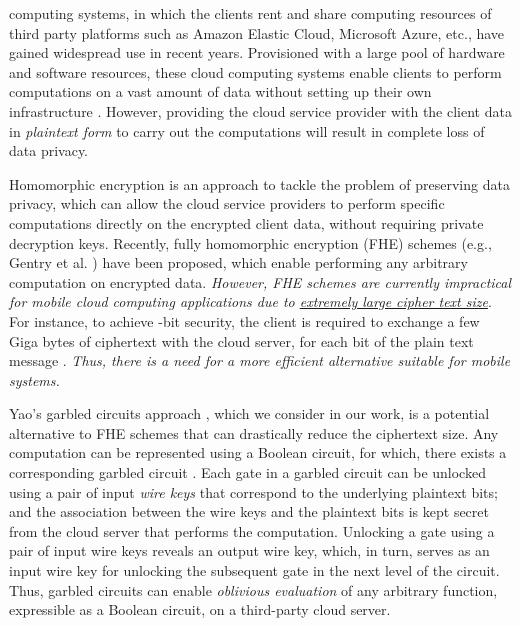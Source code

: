 \documentclass[10pt,journal,cspaper,compsoc]{IEEEtran}
\begin{document}
 computing systems, in which the clients rent and share computing resources of third party platforms such as Amazon Elastic Cloud, Microsoft Azure, etc., have gained widespread use in recent years. Provisioned with a large pool of hardware and software resources, these cloud computing systems enable clients to perform computations on a vast amount of data without setting up their own infrastructure \cite{armbrust10}. However, providing the cloud service provider with the client data in {\em plaintext form} to carry out the computations will result in complete loss of data privacy.


Homomorphic encryption \cite{rivest78} is an approach to tackle the problem of preserving data privacy, which can allow the cloud service providers to perform specific computations directly on the encrypted client data, without requiring private decryption keys. Recently, fully homomorphic encryption (FHE) schemes (e.g., Gentry et al. \cite{gentry10}) have been proposed, which enable performing any arbitrary computation on encrypted data. {\em However, FHE schemes are currently impractical for mobile cloud computing applications due to \underline{extremely large cipher text size}}. For instance, to achieve -bit security, the client is required to exchange a few Giga bytes of ciphertext with the cloud server, for each bit of the plain text message \cite{gentry10}. {\em Thus, there is a need for a more efficient alternative suitable for mobile systems.}


Yao's garbled circuits approach \cite{yao82,yao86}, which we consider in our work, is a potential alternative to FHE schemes that can drastically reduce the ciphertext size. Any computation can be represented using a Boolean circuit, for which, there exists a corresponding garbled circuit \cite{yao82,yao86,goldreich04,goldreich87}. Each gate in a garbled circuit can be unlocked using a pair of input {\em wire keys} that correspond to the underlying plaintext bits; and the association between the wire keys and the plaintext bits is kept secret from the cloud server that performs the computation. Unlocking a gate using a pair of input wire keys reveals an output wire key, which, in turn, serves as an input wire key for unlocking the subsequent gate in the next level of the circuit. Thus, garbled circuits can enable {\em oblivious evaluation} of any arbitrary function, expressible as a Boolean circuit, on a third-party cloud server.
\end{document}
